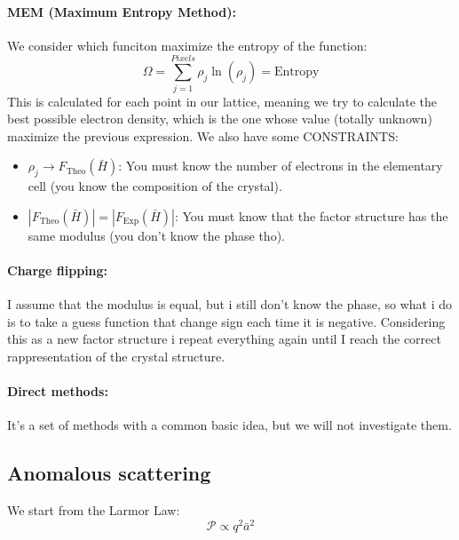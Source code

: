 \paragraph{MEM (Maximum Entropy Method):} We consider which funciton maximize the entropy of the function:
\begin{equation}
    \Omega = \sum_{j=1}^{Pixels} \rho_j \ln(\rho_j) = \text{Entropy}
\end{equation}
This is calculated for each point in our lattice, meaning we try to calculate the best possible electron density, which is the one whose value (totally unknown) maximize the previous expression.
We also have some CONSTRAINTS:
\begin{itemize}
    \item ${\rho_j} \rightarrow F_{\text{Theo}}(\bar{H})$: You must know the number of electrons in the elementary cell (you know the composition of the crystal).
    \item $|F_{\text{Theo}}(\bar{H})| = |F_{\text{Exp}}(\bar{H})|$: You must know that the factor structure has the same modulus (you don't know the phase tho).
\end{itemize}

\paragraph{Charge flipping:} I assume that the modulus is equal, but i still don't know the phase, so what i do is to take a guess function that change sign each time it is negative. Considering this as a new factor structure i repeat everything again until I reach the correct rappresentation of the crystal structure.
\paragraph{Direct methods:} It's a set of methods with a common basic idea, but we will not investigate them.

\subsection{Anomalous scattering} We start from the Larmor Law:
\begin{equation}
    \mathcal{P} \propto q^2 \bar{a}^2 
\end{equation}